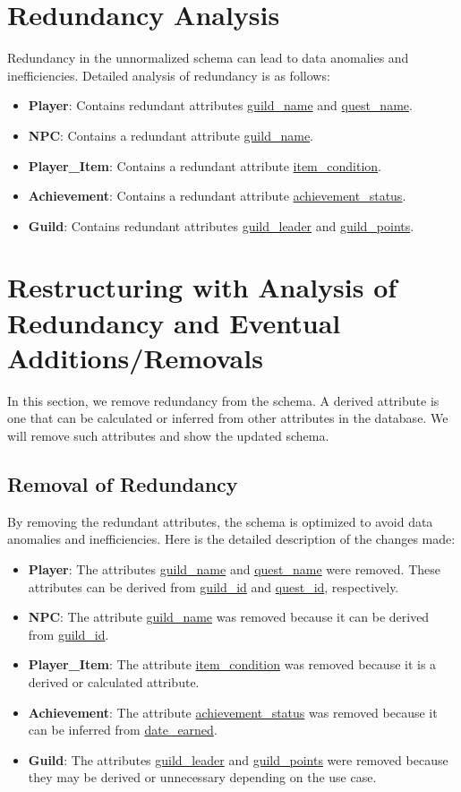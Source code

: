 \documentclass{article}%
\begin{document}
%
\section{Redundancy Analysis}%
\label{sec:RedundancyAnalysis}%
Redundancy in the unnormalized schema can lead to data anomalies and inefficiencies. Detailed analysis of redundancy is as follows:%
\begin{itemize}%
\item%
\textbf{Player}: Contains redundant attributes \underline{guild\_name} and \underline{quest\_name}.%
\item%
\textbf{NPC}: Contains a redundant attribute \underline{guild\_name}.%
\item%
\textbf{Player\_Item}: Contains a redundant attribute \underline{item\_condition}.%
\item%
\textbf{Achievement}: Contains a redundant attribute \underline{achievement\_status}.%
\item%
\textbf{Guild}: Contains redundant attributes \underline{guild\_leader} and \underline{guild\_points}.%
\end{itemize}

%
\section{Restructuring with Analysis of Redundancy and Eventual Additions/Removals}%
\label{sec:RestructuringwithAnalysisofRedundancyandEventualAdditions/Removals}%
In this section, we remove redundancy from the schema. A derived attribute is one that can be calculated or inferred from other attributes in the database. We will remove such attributes and show the updated schema.%
\subsection{Removal of Redundancy}%
\label{subsec:RemovalofRedundancy}%
By removing the redundant attributes, the schema is optimized to avoid data anomalies and inefficiencies. Here is the detailed description of the changes made:%
\begin{itemize}%
\item%
\textbf{Player}: The attributes \underline{guild\_name} and \underline{quest\_name} were removed. These attributes can be derived from \underline{guild\_id} and \underline{quest\_id}, respectively.%
\item%
\textbf{NPC}: The attribute \underline{guild\_name} was removed because it can be derived from \underline{guild\_id}.%
\item%
\textbf{Player\_Item}: The attribute \underline{item\_condition} was removed because it is a derived or calculated attribute.%
\item%
\textbf{Achievement}: The attribute \underline{achievement\_status} was removed because it can be inferred from \underline{date\_earned}.%
\item%
\textbf{Guild}: The attributes \underline{guild\_leader} and \underline{guild\_points} were removed because they may be derived or unnecessary depending on the use case.%
\end{itemize}
\end{document}
